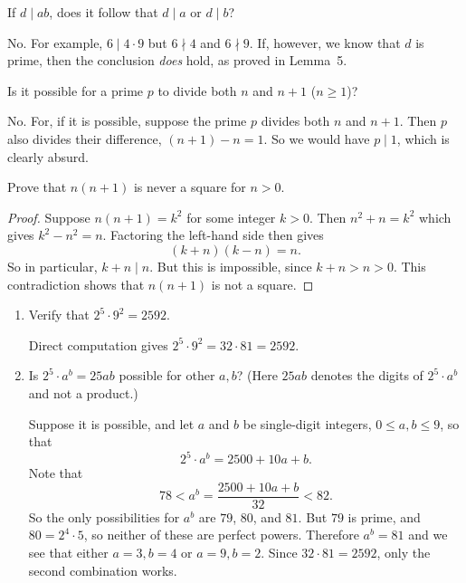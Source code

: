  If $d\mid ab$, does it follow that $d\mid a$ or $d\mid b$?
\begin{solution}
  No. For example, $6\mid 4\cdot9$ but $6\nmid4$ and $6\nmid9$. If,
  however, we know that $d$ is prime, then the conclusion {\em does}
  hold, as proved in Lemma~5.
\end{solution}

 Is it possible for a prime $p$ to divide both $n$ and $n+1$
($n\geq1$)?
\begin{solution}
  No. For, if it is possible, suppose the prime $p$ divides both $n$
  and $n+1$. Then $p$ also divides their difference, $(n+1) - n =
  1$. So we would have $p\mid1$, which is clearly absurd.
\end{solution}

 Prove that $n(n+1)$ is never a square for $n>0$.
\begin{proof}
  Suppose $n(n+1) = k^2$ for some integer $k>0$. Then $n^2+n = k^2$
  which gives $k^2 - n^2 = n$. Factoring the left-hand side then gives
  \begin{equation*}
    (k+n)(k-n) = n.
  \end{equation*}
  So in particular, $k+n\mid n$. But this is impossible, since
  $k+n > n > 0$. This contradiction shows that $n(n+1)$ is not a
  square.
\end{proof}

\begin{enumerate}
\item Verify that $2^5\cdot9^2 = 2592$.
  \begin{solution}
    Direct computation gives $2^5\cdot9^2 = 32\cdot81 = 2592$.
  \end{solution}
\item Is $2^5\cdot a^b = 25ab$ possible for other $a, b$? (Here $25ab$
  denotes the digits of $2^5\cdot a^b$ and not a product.)
  \begin{solution}
    Suppose it is possible, and let $a$ and $b$ be single-digit
    integers, $0\leq a,b\leq 9$, so that
    \begin{equation*}
      2^5\cdot a^b = 2500 + 10a + b.
    \end{equation*}
    Note that
    \begin{equation*}
      78 < a^b = \frac{2500 + 10a + b}{32} < 82.
    \end{equation*}
    So the only possibilities for $a^b$ are $79$, $80$, and $81$. But
    $79$ is prime, and $80 = 2^4\cdot5$, so neither of these are
    perfect powers. Therefore $a^b = 81$ and we see that either
    $a = 3, b = 4$ or $a = 9, b = 2$. Since $32\cdot81 = 2592$, only
    the second combination works.
  \end{solution}
\end{enumerate}

